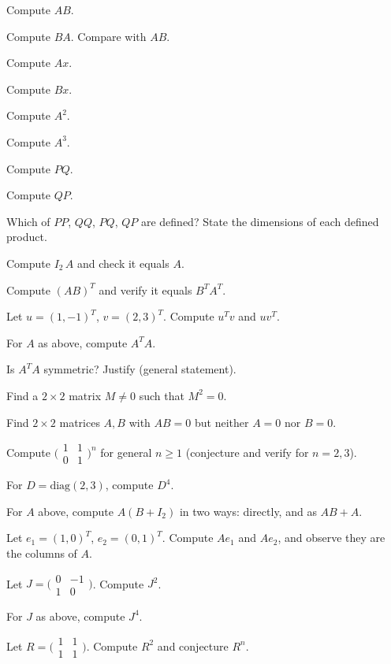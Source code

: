 \begin{problems}
    \item Compute $A B$.
    \item Compute $B A$. Compare with $A B$.
    \item Compute $A x$.
    \item Compute $B x$.
    \item Compute $A^{2}$.
    \item Compute $A^{3}$.
    \item Compute $P Q$.
    \item Compute $Q P$.
    \item Which of $P P$, $Q Q$, $P Q$, $Q P$ are defined? State the dimensions of each defined product.
    \item Compute $I_{2} \, A$ and check it equals $A$.
    \item Compute $(A B)^{T}$ and verify it equals $B^{T} A^{T}$.
    \item Let $u = (1, -1)^{T}$, $v = (2, 3)^{T}$. Compute $u^{T} v$ and $u v^{T}$.
    \item For $A$ as above, compute $A^{T} A$.
    \item Is $A^{T} A$ symmetric? Justify (general statement).
    \item Find a $2 \times 2$ matrix $M \neq 0$ such that $M^{2} = 0$.
    \item Find $2 \times 2$ matrices $A, B$ with $A B = 0$ but neither $A = 0$ nor $B = 0$.
    \item Compute $\bigl(\begin{smallmatrix} 1 & 1 \\ 0 & 1 \end{smallmatrix}\bigr)^{n}$ for general $n \ge 1$ (conjecture and verify for $n = 2, 3$).
    \item For $D = \mathrm{diag}(2, 3)$, compute $D^{4}$.
    \item For $A$ above, compute $A (B + I_{2})$ in two ways: directly, and as $A B + A$.
    \item Let $e_{1} = (1, 0)^{T}$, $e_{2} = (0, 1)^{T}$. Compute $A e_{1}$ and $A e_{2}$, and observe they are the columns of $A$.
    \item Let $J = \bigl(\begin{smallmatrix} 0 & -1 \\ 1 & 0 \end{smallmatrix}\bigr)$. Compute $J^{2}$.
    \item For $J$ as above, compute $J^{4}$.
    \item Let $R = \bigl(\begin{smallmatrix} 1 & 1 \\ 1 & 1 \end{smallmatrix}\bigr)$. Compute $R^{2}$ and conjecture $R^{n}$.

\end{problems}
